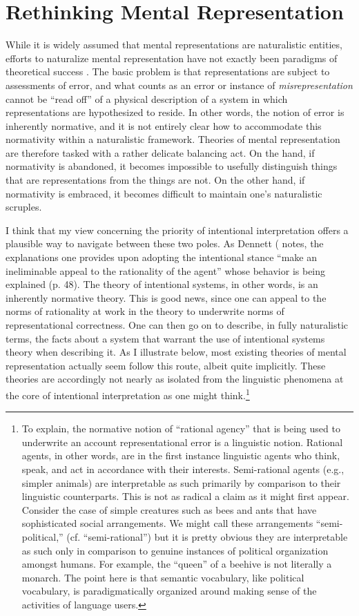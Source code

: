 \section{Rethinking Mental Representation}

While it is widely assumed that mental representations are naturalistic entities, efforts to naturalize mental representation have not exactly been paradigms of theoretical success \citep[][Ch. 3]{Horwich:2005}. The basic problem is that representations are subject to assessments of error, and what counts as an error or instance of \textit{misrepresentation} cannot be ``read off'' of a physical description of a system in which representations are hypothesized to reside. In other words, the notion of error is inherently normative, and it is not entirely clear how to accommodate this normativity within a naturalistic framework. Theories of mental representation are therefore tasked with a rather delicate balancing act. On the hand, if normativity is abandoned, it becomes impossible to usefully distinguish things that are representations from the things are not. On the other hand, if normativity is embraced, it becomes difficult to maintain one's naturalistic scruples. 

I think that my view concerning the priority of intentional interpretation offers a plausible way to navigate between these two poles. As Dennett (\citeyear{Dennett:1987} notes, the explanations one provides upon adopting the intentional stance ``make an ineliminable appeal to the rationality of the agent'' whose behavior is being explained (p. 48). The theory of intentional systems, in other words, is an inherently normative theory. This is good news, since one can appeal to the norms of rationality at work in the theory to underwrite norms of representational correctness. One can then go on to describe, in fully naturalistic terms, the facts about a system that warrant the use of intentional systems theory when describing it. As I illustrate below, most existing theories of mental representation actually seem follow this route, albeit quite implicitly. These theories are accordingly not nearly as isolated from the linguistic phenomena at the core of intentional interpretation as one might think.\footnote{To explain, the normative notion of ``rational agency'' that is being used to underwrite an account representational error is a linguistic notion. Rational agents, in other words, are in the first instance linguistic agents who think, speak, and act in accordance with their interests. Semi-rational agents (e.g., simpler animals) are interpretable as such primarily by comparison to their linguistic counterparts. This is not as radical a claim as it might first appear. Consider the case of simple creatures such as bees and ants that have sophisticated social arrangements. We might call these arrangements ``semi-political,'' (cf. ``semi-rational'') but it is pretty obvious they are interpretable as such only in comparison to genuine instances of political organization amongst humans. For example, the ``queen'' of a beehive is not literally a monarch. The point here is that semantic vocabulary, like political vocabulary, is paradigmatically organized around making sense of the activities of language users.}

